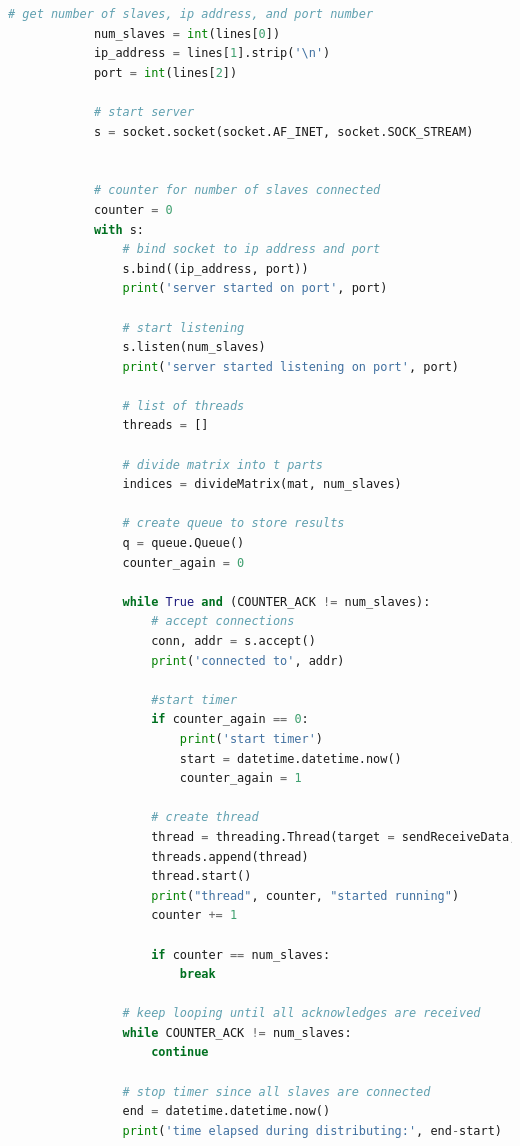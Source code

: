 \documentclass{article}
\begin{document}
\begin{lstlisting}[language=Python]
            # get number of slaves, ip address, and port number
            num_slaves = int(lines[0])
            ip_address = lines[1].strip('\n')
            port = int(lines[2])

            # start server
            s = socket.socket(socket.AF_INET, socket.SOCK_STREAM)
            

            # counter for number of slaves connected
            counter = 0
            with s:
                # bind socket to ip address and port
                s.bind((ip_address, port))
                print('server started on port', port)
                
                # start listening
                s.listen(num_slaves)
                print('server started listening on port', port)
                
                # list of threads
                threads = []

                # divide matrix into t parts
                indices = divideMatrix(mat, num_slaves)
                
                # create queue to store results
                q = queue.Queue()
                counter_again = 0

                while True and (COUNTER_ACK != num_slaves):
                    # accept connections
                    conn, addr = s.accept()
                    print('connected to', addr)

                    #start timer
                    if counter_again == 0:
                        print('start timer')
                        start = datetime.datetime.now()
                        counter_again = 1

                    # create thread
                    thread = threading.Thread(target = sendReceiveData, args = (conn, mat, indices[counter-1][0], indices[counter-1][1], q))
                    threads.append(thread)
                    thread.start()
                    print("thread", counter, "started running")
                    counter += 1
                    
                    if counter == num_slaves:
                        break
                
                # keep looping until all acknowledges are received
                while COUNTER_ACK != num_slaves:
                    continue

                # stop timer since all slaves are connected
                end = datetime.datetime.now()
                print('time elapsed during distributing:', end-start)
                

\end{lstlisting}
\end{document}
